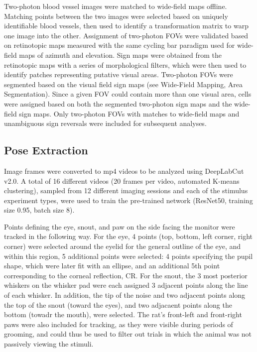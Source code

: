 Two-photon blood vessel images were matched to wide-field maps offline. Matching points between the two images were selected based on uniquely identifiable blood vessels, then used to identify a transformation matrix to warp one image into the other. Assignment of two-photon FOVs were validated based on retinotopic maps measured with the same cycling bar paradigm used for wide-field maps of azimuth and elevation. Sign maps were obtained from the retinotopic maps with a series of morphological filters\cite{Marshel2011, Garrett2014, Zhuang2017}, which were then used to identify patches representing putative visual areas. Two-photon FOVs were segmented based on the visual field sign maps (see Wide-Field Mapping, Area Segmentation). Since a given FOV could contain more than one visual area, cells were assigned based on both the segmented two-photon sign maps and the wide-field sign maps. Only two-photon FOVs with matches to wide-field maps and unambiguous sign reversals were included for subsequent analyses. 

\subsection{Pose Extraction}
Image frames were converted to mp4 videos to be analyzed using DeepLabCut v2.0\cite{Insafutdinov2016, Mathis2018, Nath2019}. A total of 16 different videos (20 frames per video, automated K-means clustering), sampled from 12 different imaging sessions and each of the stimulus experiment types, were used to train the pre-trained network (ResNet50, training size 0.95, batch size 8).

Points defining the eye, snout, and paw on the side facing the monitor were tracked in the following way. For the eye, 4 points (top, bottom, left corner, right corner) were selected around the eyelid for the general outline of the eye, and within this region, 5 additional points were selected: 4 points specifying the pupil shape, which were later fit with an ellipse, and an additional 5th point corresponding to the corneal reflection, CR. For the snout, the 3 most posterior whiskers on the whisker pad were each assigned 3 adjacent points along the line of each whisker. In addition, the tip of the noise and two adjacent points along the top of the snout (toward the eyes), and two adjacaent points along the bottom (towadr the mouth), were selected. The rat's front-left and front-right paws were also included for tracking, as they were visible during periods of grooming, and could thus be used to filter out trials in which the animal was not passively viewing the stimuli. 


